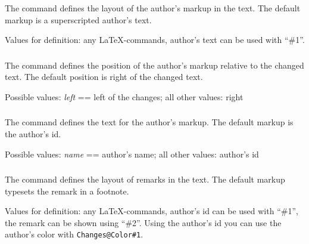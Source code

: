 \subsubsection{}
\DescribeMacro{\setauthormarkup}

The command  defines the layout of the author's markup in the text.
The default markup is a superscripted author's text.

Values for definition: any \LaTeX-commands, author's text can be used with ``\#1''.




\subsubsection{}
\DescribeMacro{\setauthormarkupposition}

The command  defines the position of the author's markup relative to the changed text.
The default position is right of the changed text.

Possible values: \emph{left} == left of the changes; all other values: right




\subsubsection{}
\DescribeMacro{\setauthormarkuptext}

The command  defines the text for the author's markup.
The default markup is the author's id.

Possible values: \emph{name} == author's name; all other values: author's id




\subsubsection{}
\DescribeMacro{\setremarkmarkup}

The command  defines the layout of remarks in the text.
The default markup typesets the remark in a footnote.

Values for definition: any \LaTeX-commands, author's id can be used with ``\#1'', the remark can be shown using ``\#2''.
Using the author's id you can use the author's color with \texttt{Changes@Color\#1}.

